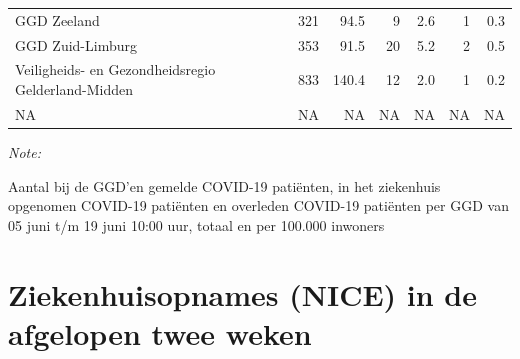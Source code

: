 \documentclass[
  english,
  man,floatsintext]{apa6}
\begin{document}
\begin{table}
\begin{threeparttable}
\begin{tabular}{lrrrrrr}
GGD Zeeland & 321 & 94.5 & 9 & 2.6 & 1 & 0.3\\
GGD Zuid-Limburg & 353 & 91.5 & 20 & 5.2 & 2 & 0.5\\
Veiligheids- en Gezondheidsregio Gelderland-Midden & 833 & 140.4 & 12 & 2.0 & 1 & 0.2\\
NA & NA & NA & NA & NA & NA & NA\\
\bottomrule
\end{tabular}
\begin{tablenotes}
\item \textit{Note: } 
\item Aantal bij de GGD’en gemelde COVID-19 patiënten, in het ziekenhuis opgenomen COVID-19 patiënten en overleden COVID-19 patiënten per GGD van 05 juni t/m 19 juni 10:00 uur, totaal en per 100.000 inwoners
\end{tablenotes}
\end{threeparttable}
\endgroup{}
\end{table}

\newpage

\hypertarget{ziekenhuisopnames-nice-in-de-afgelopen-twee-weken}{%
\section{Ziekenhuisopnames (NICE) in de afgelopen twee weken}\label{ziekenhuisopnames-nice-in-de-afgelopen-twee-weken}}
\end{document}
